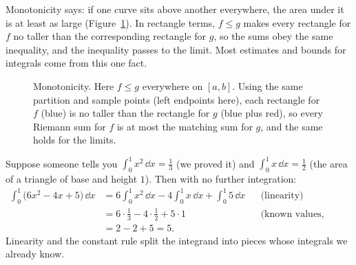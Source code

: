 \begin{intuitionbox}
Monotonicity says: if one curve sits above another
everywhere, the area under it is at least as large
(Figure~\ref{ch20:fig-monotonicity}).
In rectangle terms, $f \le g$ makes every rectangle for $f$ no taller than the
corresponding rectangle for $g$, so the sums obey the same inequality, and the
inequality passes to the limit. Most estimates and bounds for integrals come
from this one fact.
\end{intuitionbox}

\begin{figure}[htbp]
\centering
{}
\caption{Monotonicity. Here $f \le g$ everywhere on $[a,b]$. Using the same
partition and sample points (left endpoints here), each rectangle for $f$ (blue)
is no taller than the rectangle for $g$ (blue plus red), so every Riemann sum for
$f$ is at most the matching sum for $g$, and the same holds for the limits.}
\label{ch20:fig-monotonicity}
\end{figure}

\begin{example}
\label{ch20:ex-properties}
Suppose someone tells you $\int_0^1 x^2\,\dd x = \tfrac13$ (we proved it) and
$\int_0^1 x\,\dd x = \tfrac12$ (the area of a triangle of base and height $1$).
Then with no further integration:
\begin{align*}
  \int_0^1 \big(6x^2 - 4x + 5\big)\,\dd x
  &= 6\int_0^1 x^2\,\dd x - 4\int_0^1 x\,\dd x + \int_0^1 5\,\dd x
     && \text{(linearity)} \\
  &= 6\cdot\tfrac13 - 4\cdot\tfrac12 + 5\cdot 1
     && \text{(known values, constant rule)} \\
  &= 2 - 2 + 5 = 5.
\end{align*}
Linearity and the constant rule split the integrand into pieces whose
integrals we already know.
\end{example}

